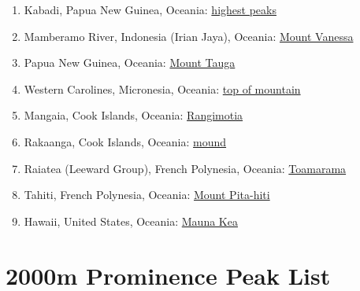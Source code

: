 \documentclass[10pt,twocolumn,letterpaper]{article}
\begin{document}
\begin{flushleft}
\begin{enumerate}
\item Kabadi, Papua New Guinea, Oceania: \href{http://www.talkorigins.org/faqs/flood-myths.html#Kabadi}{highest peaks}
\item Mamberamo River, Indonesia (Irian Jaya), Oceania: \href{http://www.talkorigins.org/faqs/flood-myths.html#MamberaoRiver}{Mount Vanessa}
\item Papua New Guinea, Oceania: \href{http://www.talkorigins.org/faqs/flood-myths.html#PapuaNewGuinea}{Mount Tauga}
\item Western Carolines, Micronesia, Oceania: \href{http://www.talkorigins.org/faqs/flood-myths.html#westCarolines}{top of mountain}
\item Mangaia, Cook Islands, Oceania: \href{http://www.talkorigins.org/faqs/flood-myths.html#Mangaia}{Rangimotia}
\item Rakaanga, Cook Islands, Oceania: \href{http://www.talkorigins.org/faqs/flood-myths.html#Rakaanga}{mound}
\item Raiatea (Leeward Group), French Polynesia, Oceania: \href{http://www.talkorigins.org/faqs/flood-myths.html#Raiatea}{Toamarama}
\item Tahiti, French Polynesia, Oceania: \href{http://www.talkorigins.org/faqs/flood-myths.html#Tahiti}{Mount Pita-hiti}
\item Hawaii, United States, Oceania: \href{http://www.talkorigins.org/faqs/flood-myths.html#Hawaii}{Mauna Kea}
\end{enumerate}
\end{flushleft}

\clearpage
\twocolumn

\section{2000m Prominence Peak List}

\end{document}
